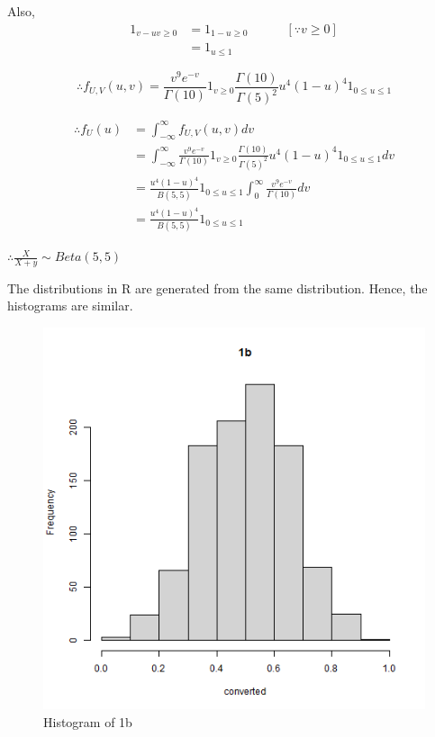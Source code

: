 \documentclass[12pt,letterpaper]{article}
\begin{document}
Also,
\begin{align*}
  1_{v-uv \geq 0} &= 1_{1-u \geq 0}\hspace{3em}[\because v \geq 0]\\
  &= 1_{u \leq 1}
\end{align*}

$$\therefore f_{U,V}(u, v) = \frac{v^9 e^{-v}}{\Gamma(10)}1_{v \geq 0}\frac{\Gamma(10)}{\Gamma(5)^2}u^4(1-u)^4 1_{0 \leq u \leq 1}$$

\begin{align*}
  \therefore f_U(u) &= \int_{-\infty}^{\infty} f_{U,V}(u, v) dv\\
  &= \int_{-\infty}^{\infty}\frac{v^9 e^{-v}}{\Gamma(10)}1_{v \geq 0}\frac{\Gamma(10)}{\Gamma(5)^2}u^4(1-u)^4 1_{0 \leq u \leq 1}dv\\
  &= \frac{u^4(1-u)^4}{B(5,5)}1_{0 \leq u \leq 1}\int_{0}^{\infty}\frac{v^9 e^{-v}}{\Gamma(10)}dv\\
  &= \frac{u^4(1-u)^4}{B(5,5)}1_{0 \leq u \leq 1}
\end{align*}

$\therefore \frac{X}{X+y} \sim Beta(5,5)$

The distributions in R are generated from the same distribution. Hence, the histograms are similar.
\newpage
\begin{figure}[h]
  \centering
  \includegraphics[width=15cm]{Histogram_1.png}
  \caption{Histogram of 1b}
\end{figure}
\end{document}

